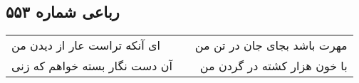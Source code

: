 \begin{center}
\section*{رباعی شماره ۵۵۳}
\label{sec:sh553}
\begin{longtable}{l p{0.5cm} r}
ای آنکه تراست عار از دیدن من
&&
مهرت باشد بجای جان در تن من
\\
آن دست نگار بسته خواهم که زنی
&&
با خون هزار کشته در گردن من
\\
\end{longtable}
\end{center}
